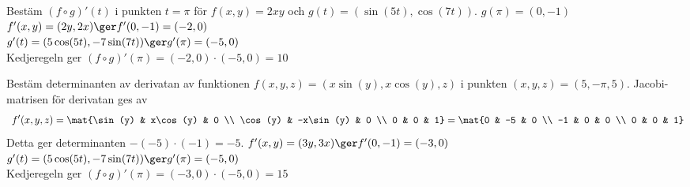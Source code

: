 Bestäm $(f \circ g)'(t)$ i punkten $t = \pi$ för $f(x, y) = 2xy$
och $g(t) = (\sin(5t), \cos(7t))$.
$g(\pi) = (0, -1)$ \\
$f'(x, y) = (2y, 2x) \ger f'(0, -1) = (-2, 0)$ \\
$g'(t) = (5\cos(5t), -7\sin(7t)) \ger g'(\pi) = (-5, 0)$ \\
Kedjeregeln ger $(f \circ g)'(\pi) = (-2, 0) \cdot (-5, 0) = 10$
%

Bestäm determinanten av derivatan av funktionen $f(x, y, z) = (x\sin(y),
x\cos(y), z)$ i punkten $(x, y, z) = (5, -\pi, 5)$.
Jacobi-matrisen för derivatan ges av
\begin{align*}\
  f'(x, y, z)
  = \mat{\sin(y) & x\cos(y) & 0 \\ \cos(y) & -x\sin(y) & 0 \\ 0 & 0 & 1}
  = \mat{0 & -5 & 0 \\ -1 & 0 & 0 \\ 0 & 0 & 1}
\end{align*}
Detta ger determinanten $- (-5)\cdot (-1) = -5$.
%
$f'(x, y) = (3y, 3x) \ger f'(0, -1) = (-3, 0)$ \\
$g'(t) = (5\cos(5t), -7\sin(7t)) \ger g'(\pi) = (-5, 0)$ \\
Kedjeregeln ger $(f \circ g)'(\pi) = (-3, 0) \cdot (-5, 0) = 15$
%
